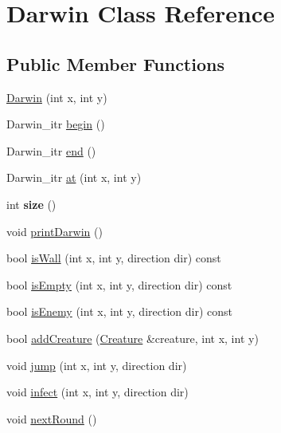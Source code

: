 \hypertarget{classDarwin}{\section{Darwin Class Reference}
\label{classDarwin}
}
\subsection*{Public Member Functions}
\begin{DoxyCompactItemize}
\item 
\hyperlink{classDarwin_ab19aeb32fa31eee1f42c38b18aa14673}{Darwin} (int x, int y)
\item 
Darwin\-\_\-itr \hyperlink{classDarwin_adccd56db6d43ce6ec63f9017904c402d}{begin} ()
\item 
Darwin\-\_\-itr \hyperlink{classDarwin_aa397a48ac869d60370eb45afb8029235}{end} ()
\item 
Darwin\-\_\-itr \hyperlink{classDarwin_aa40482e6121a429c6e7182277bf7dedf}{at} (int x, int y)
\item 
\hypertarget{classDarwin_aa82f89c8d713dae487b19334286701fd}{int {\bfseries size} ()}\label{classDarwin_aa82f89c8d713dae487b19334286701fd}

\item 
void \hyperlink{classDarwin_a020a2bdf3d1c6dc09b398ced0737dde2}{print\-Darwin} ()
\item 
bool \hyperlink{classDarwin_a7ad6fc24f8ba3e2389965e8029ef0487}{is\-Wall} (int x, int y, direction dir) const 
\item 
bool \hyperlink{classDarwin_a4240b72abe5bfe81b9231e17bfed402e}{is\-Empty} (int x, int y, direction dir) const 
\item 
bool \hyperlink{classDarwin_a744523862174b45ecb726db361b62b6e}{is\-Enemy} (int x, int y, direction dir) const 
\item 
bool \hyperlink{classDarwin_aba5b087ebf08b7eb510f564f08ea9a09}{add\-Creature} (\hyperlink{classCreature}{Creature} \&creature, int x, int y)
\item 
void \hyperlink{classDarwin_a3fb49527acefcf488b6e242c3514e1a7}{jump} (int x, int y, direction dir)
\item 
void \hyperlink{classDarwin_ad07c3114883f7d89b355e0b950dadc49}{infect} (int x, int y, direction dir)
\item 
void \hyperlink{classDarwin_a164b5300f0046b386752633b66f7b8a9}{next\-Round} ()
\end{DoxyCompactItemize}


